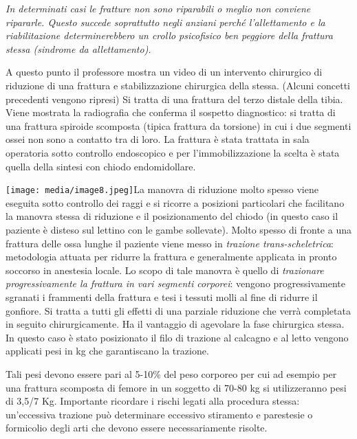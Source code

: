 \documentclass[]{article}
\begin{document}
\emph{In determinati casi le fratture non sono riparabili o meglio non
conviene ripararle. Questo succede soprattutto negli anziani perché
l'allettamento e la riabilitazione determinerebbero un crollo
psicofisico ben peggiore della frattura stessa (sindrome da
allettamento).}

A questo punto il professore mostra un video di un intervento chirurgico
di riduzione di una frattura e stabilizzazione chirurgica della stessa.
(Alcuni concetti precedenti vengono ripresi) Si tratta di una frattura
del terzo distale della tibia. Viene mostrata la radiografia che
conferma il sospetto diagnostico: si tratta di una frattura spiroide
scomposta (tipica frattura da torsione) in cui i due segmenti ossei non
sono a contatto tra di loro. La frattura è stata trattata in sala
operatoria sotto controllo endoscopico e per l'immobilizzazione la
scelta è stata quella della sintesi con chiodo endomidollare.

\texttt{[image: media/image8.jpeg]}La
manovra di riduzione molto spesso viene eseguita sotto controllo dei
raggi e si ricorre a posizioni particolari che facilitano la manovra
stessa di riduzione e il posizionamento del chiodo (in questo caso il
paziente è disteso sul lettino con le gambe sollevate). Molto spesso di
fronte a una frattura delle ossa lunghe il paziente viene messo in
\emph{trazione trans-scheletrica}: metodologia attuata per ridurre la
frattura e generalmente applicata in pronto soccorso in anestesia
locale. Lo scopo di tale manovra è quello di \emph{trazionare
progressivamente la frattura in vari segmenti corporei}: vengono
progressivamente sgranati i frammenti della frattura e tesi i tessuti
molli al fine di ridurre il gonfiore. Si tratta a tutti gli effetti di
una parziale riduzione che verrà completata in seguito chirurgicamente.
Ha il vantaggio di agevolare la fase chirurgica stessa. In questo caso è
stato posizionato il filo di trazione al calcagno e al letto vengono
applicati pesi in kg che garantiscano la trazione.

Tali pesi devono essere pari al 5-10\% del peso corporeo per cui ad
esempio per una frattura scomposta di femore in un soggetto di 70-80 kg
si utilizzeranno pesi di 3,5/7 Kg. Importante ricordare i rischi legati
alla procedura stessa: un'eccessiva trazione può determinare eccessivo
stiramento e parestesie o formicolio degli arti che devono essere
necessariamente risolte.
\end{document}
